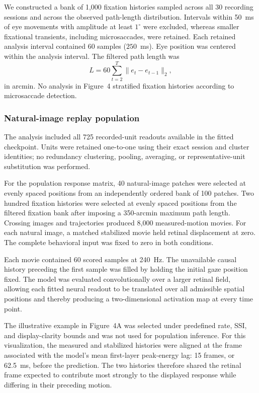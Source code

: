\documentclass{lite}
\begin{document}
We constructed a bank of 1{,}000 fixation histories sampled across all 30 recording sessions and across the observed path-length distribution. Intervals within 50~ms of eye movements with amplitude at least $1^\circ$ were excluded, whereas smaller fixational transients, including microsaccades, were retained. Each retained analysis interval contained 60 samples ($250$~ms). Eye position was centered within the analysis interval. The filtered path length was
\begin{equation}
L = 60\sum_{t=2}^{T}\lVert e_t-e_{t-1}\rVert_2,
\end{equation}
in arcmin. No analysis in Figure~4 stratified fixation histories according to microsaccade detection.

\subsubsection{Natural-image replay population}

The analysis included all 725 recorded-unit readouts available in the fitted checkpoint. Units were retained one-to-one using their exact session and cluster identities; no redundancy clustering, pooling, averaging, or representative-unit substitution was performed.

For the population response matrix, 40 natural-image patches were selected at evenly spaced positions from an independently ordered bank of 100 patches. Two hundred fixation histories were selected at evenly spaced positions from the filtered fixation bank after imposing a 350-arcmin maximum path length. Crossing images and trajectories produced 8{,}000 measured-motion movies. For each natural image, a matched stabilized movie held retinal displacement at zero. The complete behavioral input was fixed to zero in both conditions.

Each movie contained 60 scored samples at 240~Hz. The unavailable causal history preceding the first sample was filled by holding the initial gaze position fixed. The model was evaluated convolutionally over a larger retinal field, allowing each fitted neural readout to be translated over all admissible spatial positions and thereby producing a two-dimensional activation map at every time point.

The illustrative example in Figure~4A was selected under predefined rate, SSI, and display-clarity bounds and was not used for population inference. For this visualization, the measured and stabilized histories were aligned at the frame associated with the model's mean first-layer peak-energy lag: 15 frames, or 62.5~ms, before the prediction. The two histories therefore shared the retinal frame expected to contribute most strongly to the displayed response while differing in their preceding motion.
\end{document}
